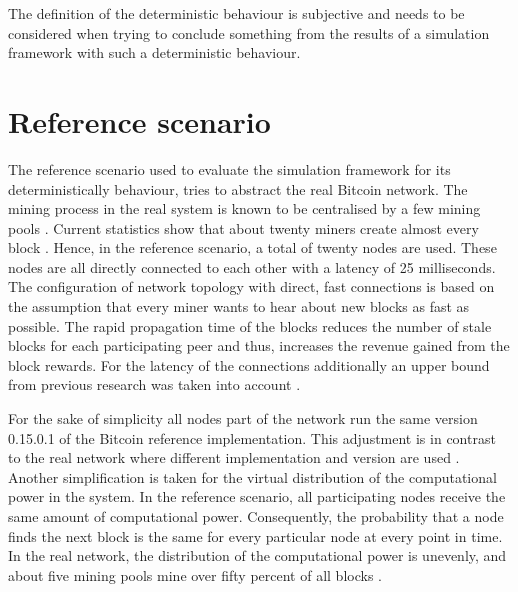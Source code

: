 The definition of the deterministic behaviour is subjective and needs to be considered when trying to conclude something from the results of a simulation framework with such a deterministic behaviour.

\section{Reference scenario}
\label{chap:reference_scenario}

The reference scenario used to evaluate the simulation framework for its deterministically behaviour, tries to abstract the real Bitcoin network.
The mining process in the real system is known to be centralised by a few mining pools \cite{gervais2014bitcoin, beikverdi2015trend, tschorsch2016bitcoin, clarkresearch, gencer2018decentralization}.
Current statistics show that about twenty miners create almost every block \cite{gencer2018decentralization, blockchaininfopools, coindanceblocks, bitcointickerpools}.
Hence, in the reference scenario, a total of twenty nodes are used.
These nodes are all directly connected to each other with a latency of 25 milliseconds.
The configuration of network topology with direct, fast connections is based on the assumption that every miner wants to hear about new blocks as fast as possible.
The rapid propagation time of the blocks reduces the number of stale blocks for each participating peer and thus, increases the revenue gained from the block rewards.
For the latency of the connections additionally an upper bound from previous research was taken into account \cite{decker2013information}.

For the sake of simplicity all nodes part of the network run the same version 0.15.0.1 \cite{bitcoin15} of the Bitcoin reference implementation.
This adjustment is in contrast to the real network where different implementation and version are used \cite{coindancenodes}.
Another simplification is taken for the virtual distribution of the computational power in the system.
In the reference scenario, all participating nodes  receive the same amount of computational power.
Consequently, the probability that a node finds the next block is the same for every particular node at every point in time.
In the real network, the distribution of the computational power is unevenly, and about five mining pools mine over fifty percent of all blocks \cite{gervais2014bitcoin, blockchaininfopools, coindanceblocks, bitcointickerpools}. 

